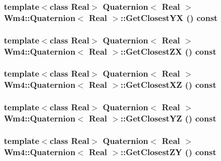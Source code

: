 \subsubsection{\setlength{\rightskip}{0pt plus 5cm}template$<$class Real$>$ {\bf Quaternion}$<$ Real $>$ {\bf Wm4::Quaternion}$<$ Real $>$::Get\-Closest\-YX () const}\label{classWm4_1_1Quaternion_910054a6b831f9965048e60b8706cf02}


\subsubsection{\setlength{\rightskip}{0pt plus 5cm}template$<$class Real$>$ {\bf Quaternion}$<$ Real $>$ {\bf Wm4::Quaternion}$<$ Real $>$::Get\-Closest\-ZX () const}\label{classWm4_1_1Quaternion_42ed27b9035d068f0c3bf8e3bfe88ae0}


\subsubsection{\setlength{\rightskip}{0pt plus 5cm}template$<$class Real$>$ {\bf Quaternion}$<$ Real $>$ {\bf Wm4::Quaternion}$<$ Real $>$::Get\-Closest\-XZ () const}\label{classWm4_1_1Quaternion_16a1d48db7c70e1c360f4ccd626043c2}


\subsubsection{\setlength{\rightskip}{0pt plus 5cm}template$<$class Real$>$ {\bf Quaternion}$<$ Real $>$ {\bf Wm4::Quaternion}$<$ Real $>$::Get\-Closest\-YZ () const}\label{classWm4_1_1Quaternion_2069a9806bb9cfddee4665a50d4e7997}


\subsubsection{\setlength{\rightskip}{0pt plus 5cm}template$<$class Real$>$ {\bf Quaternion}$<$ Real $>$ {\bf Wm4::Quaternion}$<$ Real $>$::Get\-Closest\-ZY () const}\label{classWm4_1_1Quaternion_ba055546010a994ca3556c74b6c22f27}


